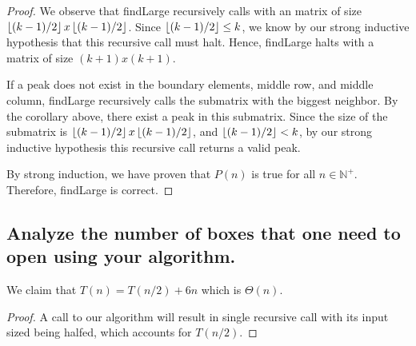 \documentclass[11pt]{scrartcl}
\begin{document}
\begin{proof}
	\par We observe that findLarge recursively calls with an matrix of size 
	$\left\lfloor (k-1) / 2 \right\rfloor x \left\lfloor (k-1) / 2 \right\rfloor$.
	Since $\left\lfloor (k-1) / 2 \right\rfloor \leq k$, we know by our strong inductive hypothesis that this
	recursive call must halt. Hence, findLarge halts with a matrix of size $(k+1)x(k+1)$.
	
	\par If a peak does not exist in the boundary elements, middle row, and middle column, findLarge 
	recursively calls the submatrix with the biggest neighbor. By the corollary above, there 
	exist a peak in this submatrix. Since the size of the submatrix is $\left\lfloor (k-1) / 2 \right\rfloor x \left\lfloor (k-1) / 2 \right\rfloor$,
	and $\left\lfloor (k-1) / 2 \right\rfloor < k$, by our strong inductive hypothesis this recursive call returns a valid peak.

	\par By strong induction, we have proven that $P(n)$ is true for all $n \in \mathbb{N^{+}}$.
	Therefore, findLarge is correct.
\end{proof}

\subsection{
	Analyze the number of boxes that one need to open using your algorithm.
}
We claim that $T(n) = T(n/2) + 6n$ which is $\Theta(n)$.
\begin{proof}
	A call to our algorithm will result in single recursive call
	with its input sized being halfed, which accounts for $T(n/2)$.
\end{proof}
\end{document}
